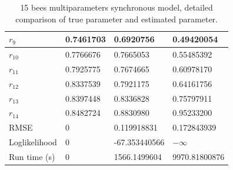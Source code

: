 \documentclass[12pt]{article}
\theoremstyle{definition}
\begin{document}
\begin{table}[H]
\begin{tabular}{|l|l|l|l|}
$r_9$                        & 0.7461703 & 0.6920756                                                                  & 0.49420054                                                            \\ \hline
$r_{10}$                     & 0.7766676 & 0.7665053                                                                  & 0.55485392                                                            \\ \hline
$r_{11}$                     & 0.7925775 & 0.7674665                                                                  & 0.60978170                                                            \\ \hline
$r_{12}$                     & 0.8337539 & 0.7921175                                                                  & 0.64161756                                                            \\ \hline
$r_{13}$                     & 0.8397448 & 0.8336828                                                                  & 0.75797911                                                            \\ \hline
$r_{14}$                     & 0.8482724 & 0.8830980                                                                  & 0.95233200                                                            \\ \hline
RMSE                         & 0                & 0.119918831                                                                       & 0.172843939                                                                   \\ \hline
Loglikelihood                & 0                & -67.353440566                                                                     & $-\infty$                                                                     \\ \hline
Run time (s)                 & 0                & 1566.1499604                                                                      & 9970.81800876                                                                 \\ \hline
\end{tabular}
\caption{15 bees multiparameters synchronous model, detailed comparison of true
  parameter and estimated parameter.}
\end{table}
\end{document}
